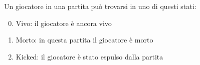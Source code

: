 Un giocatore in una partita può trovarsi in uno di questi stati:

\begin{enumerate}
	\setcounter{enumi}{-1}
	\item Vivo: il giocatore è ancora vivo
	\item Morto: in questa partita il giocatore è morto
	\item Kicked: il giocatore è stato espulso dalla partita
\end{enumerate}